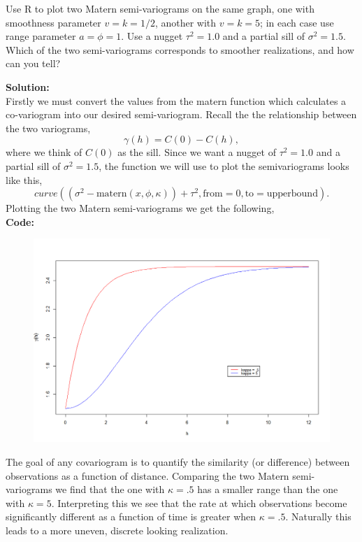 \documentclass[12pt]{article}
\makeatletter
\theoremstyle{homework}
\newenvironment{exercise}[1]
{\def\@currentlabel{#1}\exercisecore}
{\endexercisecore}
\newcommand{\localhead}[1]{\par\smallskip\noindent\textbf{#1}\nobreak\\}%
\newcommand\solution{\localhead{Solution:}}
\makeatother
\begin{document}
\begin{exercise}{1}Use R to plot two Matern semi-variograms on the same graph, one with smoothness parameter
  $v = k = 1/2$, another with $v = k = 5$; in each case use range parameter $a = \phi = 1$. Use a nugget 
  $\tau^2 = 1.0$ and a partial sill of $\sigma^2 = 1.5$. Which of the two semi-variograms corresponds to smoother realizations, 
  and how can you tell?\\
  \solution Firstly we must convert the values from the matern function which calculates a co-variogram into our desired semi-variogram. Recall the
  the relationship between the two variograms, 
  \begin{equation*}
    \gamma(h) = C(0) - C(h),
  \end{equation*} 
  where we think of $C(0)$ as the sill. Since we want a nugget of $\tau^2 = 1.0$ and a partial sill of $\sigma^2 = 1.5$, the function we will use to plot the semivariograms looks like this, 
  \begin{equation*}
    curve((\sigma^2 - \text{matern}(x, \phi, \kappa)) + \tau^2, \text{from} = 0, \text{to} = \text{upperbound}). 
  \end{equation*}
  Plotting the two Matern semi-variograms we get the following, \\
  \textbf{Code:}
  \begin{center}
  
  \end{center}
  \begin{figure}[H]
    \begin{center}
    \includegraphics[width = .90\textwidth]{Rplot.png}
    \end{center}
  \end{figure}
  The goal of any covariogram is to quantify the similarity (or difference) between observations as a function of distance. Comparing the two Matern semi-variograms we find that 
  the one with $\kappa = .5$ has a smaller range than the one with $\kappa = 5$. Interpreting this we see that the rate at which observations become significantly different as a function of time
  is greater when $\kappa = .5$. Naturally this leads to a more uneven, discrete looking realization.
\end{exercise}
\vspace{1in}
\end{document}
